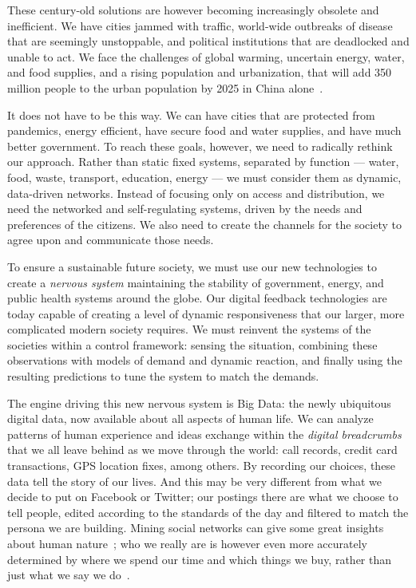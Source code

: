 These century-old solutions are however becoming increasingly obsolete and inefficient.
We have cities jammed with traffic, world-wide outbreaks of disease that are seemingly unstoppable, and political institutions that are deadlocked and unable to act.
We face the challenges of global warming, uncertain energy, water, and food supplies, and a rising population and urbanization, that will add 350 million people to the urban population by 2025 in China alone~\cite{cities2009}.

It does not have to be this way.
We can have cities that are protected from pandemics, energy efficient, have secure food and water supplies, and have much better government.
To reach these goals, however, we need to radically rethink our approach.
Rather than static fixed systems, separated by function --- water, food, waste, transport, education, energy --- we must consider them as dynamic, data-driven networks.
Instead of focusing only on access and distribution, we need the networked and self-regulating systems, driven by the needs and preferences of the citizens.
We also need to create the channels for the society to agree upon and communicate those needs. 

To ensure a sustainable future society, we must use our new technologies to create a \emph{nervous system} maintaining the stability of government, energy, and public health systems around the globe.
Our digital feedback technologies are today capable of creating a level of dynamic responsiveness that our larger, more complicated modern society requires.
We must reinvent the systems of the societies within a control framework: sensing the situation, combining these observations with models of demand and dynamic reaction, and finally using the resulting predictions to tune the system to match the demands.

The engine driving this new nervous system is Big Data: the newly ubiquitous digital data, now available about all aspects of human life.
We can analyze patterns of human experience and ideas exchange within the \emph{digital breadcrumbs} that we all leave behind as we move through the world: call records, credit card transactions, GPS location fixes, among others.
By recording our choices, these data tell the story of our lives.
And this may be very different from what we decide to put on Facebook or Twitter; our postings there are what we choose to tell people, edited according to the standards of the day and filtered to match the persona we are building.
Mining social networks can give some great insights about human nature~\cite{aral2012identifying,mislove2010pulse, vitak2011s}; who we really are is however even more accurately determined by where we spend our time and which things we buy, rather than just what we say we do~\cite{madrigal2013dark}.

